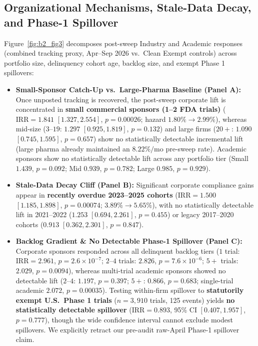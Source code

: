 \documentclass[11pt,letterpaper]{article}
\begin{document}
\subsection{Organizational Mechanisms, Stale-Data Decay, and Phase-1 Spillover}
Figure~\ref{fig:b2_fig3} decomposes post-sweep Industry and Academic responses (combined tracking proxy, Apr--Sep 2026 vs.\ Clean Exempt controls) across portfolio size, delinquency cohort age, backlog size, and exempt Phase 1 spillovers:
\begin{itemize}
    \item \textbf{Small-Sponsor Catch-Up vs.\ Large-Pharma Baseline (Panel A):} Once unposted tracking is recovered, the post-sweep corporate lift is concentrated in \textbf{small commercial sponsors (1--2 FDA trials)} ($\mathrm{IRR}=1.841$ $[1.327, 2.554]$, $p=0.00026$; hazard $1.80\%\to 2.99\%$), whereas mid-size ($3$--$19$: $1.297$ $[0.925, 1.819]$, $p=0.132$) and large firms ($20+$: $1.090$ $[0.745, 1.595]$, $p=0.657$) show no statistically detectable incremental lift (large pharma already maintained an $8.22\%/\text{mo}$ pre-sweep rate). Academic sponsors show no statistically detectable lift across any portfolio tier (Small $1.439$, $p=0.092$; Mid $0.939$, $p=0.782$; Large $0.985$, $p=0.929$).
    \item \textbf{Stale-Data Decay Cliff (Panel B):} Significant corporate compliance gains appear in \textbf{recently overdue 2023--2025 cohorts} ($\mathrm{IRR}=1.500$ $[1.185, 1.898]$, $p=0.00074$; $3.89\%\to 5.65\%$), with no statistically detectable lift in 2021--2022 ($1.253$ $[0.694, 2.261]$, $p=0.455$) or legacy 2017--2020 cohorts ($0.913$ $[0.362, 2.301]$, $p=0.847$).
    \item \textbf{Backlog Gradient \& No Detectable Phase-1 Spillover (Panel C):} Corporate sponsors responded across all delinquent backlog tiers ($1$ trial: $\mathrm{IRR}=2.961$, $p=2.6\times 10^{-7}$; $2$--$4$ trials: $2.826$, $p=7.6\times 10^{-6}$; $5+$ trials: $2.029$, $p=0.0094$), whereas multi-trial academic sponsors showed no detectable lift ($2$--$4$: $1.197$, $p=0.397$; $5+$: $0.866$, $p=0.683$; single-trial academic $2.072$, $p=0.00035$). Testing within-firm spillover to \textbf{statutorily exempt U.S.\ Phase 1 trials} ($n=3,910$ trials, 125 events) yields \textbf{no statistically detectable spillover} ($\mathrm{IRR}=0.893$, 95\% CI $[0.407, 1.957]$, $p=0.777$), though the wide confidence interval cannot exclude modest spillovers. We explicitly retract our pre-audit raw-April Phase-1 spillover claim.
\end{itemize}
\end{document}
